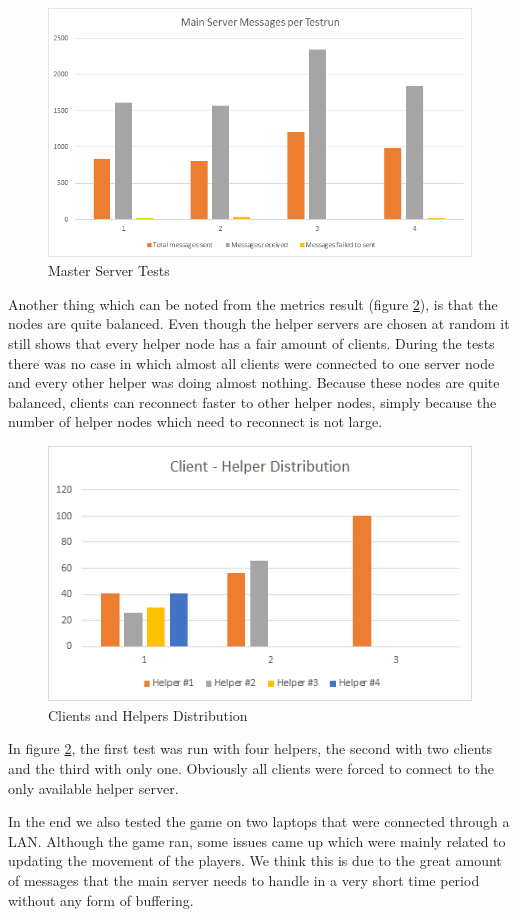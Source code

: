 \begin{figure}[!ht]
\centering
\includegraphics[scale=0.8]{images/master_hist.png}
\caption{Master Server Tests}
\label{master_hist}
\end{figure}

Another thing which can be noted from the metrics result (figure \ref{client_helper}), is that the nodes are quite balanced.
Even though the helper servers are chosen at random it still shows that every helper node has a fair amount of clients.
During the tests there was no case in which almost all clients were connected to one server node and every other helper was doing almost nothing.
Because these nodes are quite balanced, clients can reconnect faster to other helper nodes, simply because the number of helper nodes which need to reconnect is not large.

\begin{figure}[!ht]
\centering
\includegraphics[scale=0.8]{images/client_helper.png}
\caption{Clients and Helpers Distribution}
\label{client_helper}
\end{figure}

In figure \ref{client_helper}, the first test was run with four helpers, the second with two clients and the third with only one.
Obviously all clients were forced to connect to the only available helper server.

In the end we also tested the game on two laptops that were connected through a LAN. Although the game ran, some issues came up which were mainly related to updating the movement of the players. We think this is due to the great amount of messages that the main server needs to handle in a very short time period without any form of buffering.


